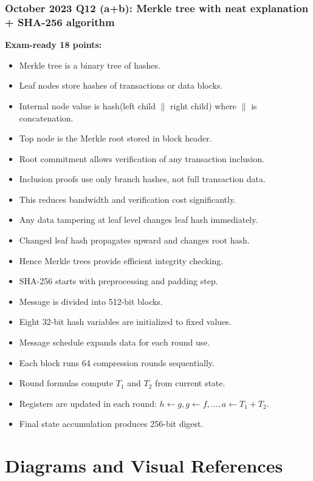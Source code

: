 \documentclass[12pt,a4paper]{article}
\begin{document}
\subsubsection*{October 2023 Q12 (a+b): Merkle tree with neat explanation + SHA-256 algorithm}
\textbf{Exam-ready 18 points:}
\begin{itemize}
\item Merkle tree is a binary tree of hashes.
\item Leaf nodes store hashes of transactions or data blocks.
\item Internal node value is hash(left child \(\|\) right child) where \(\|\) is concatenation.
\item Top node is the Merkle root stored in block header.
\item Root commitment allows verification of any transaction inclusion.
\item Inclusion proofs use only branch hashes, not full transaction data.
\item This reduces bandwidth and verification cost significantly.
\item Any data tampering at leaf level changes leaf hash immediately.
\item Changed leaf hash propagates upward and changes root hash.
\item Hence Merkle trees provide efficient integrity checking.
\item SHA-256 starts with preprocessing and padding step.
\item Message is divided into 512-bit blocks.
\item Eight 32-bit hash variables are initialized to fixed values.
\item Message schedule expands data for each round use.
\item Each block runs 64 compression rounds sequentially.
\item Round formulas compute \(T_1\) and \(T_2\) from current state.
\item Registers are updated in each round: \(h\leftarrow g, g\leftarrow f, \ldots, a\leftarrow T_1+T_2\).
\item Final state accumulation produces 256-bit digest.
\end{itemize}

\section{Diagrams and Visual References}
\end{document}
